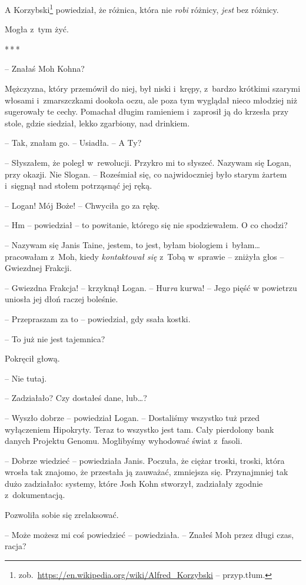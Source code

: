 \documentclass[oneside,polish,11pt,sfheadings]{mwbk}
\newcommand{\threeast}{\bigskip\par\centerline{*\,*\,*}\medskip\par}%
\begin{document}
A Korzybski\footnote{ 
zob.~\url{https://en.wikipedia.org/wiki/Alfred\_Korzybski} -- przyp.tłum.} powiedział, że różnica, która nie \emph{robi} różnicy,
\emph{jest }bez różnicy. 

Mogła z~tym żyć.
  \threeast 

-- Znałaś Moh Kohna?

Mężczyzna, który przemówił do niej, był niski i~krępy, z~bardzo krótkimi
szarymi włosami i~zmarszczkami dookoła oczu, ale poza tym wyglądał nieco
młodziej niż sugerowały te cechy. Pomachał długim ramieniem i~zaprosił
ją do krzesła przy stole, gdzie siedział, lekko zgarbiony, nad drinkiem.

-- Tak, znałam go. -- Usiadła. -- A Ty?

-- Słyszałem, że poległ w~rewolucji. Przykro mi to słyszeć. Nazywam się
Logan, przy okazji. Nie Slogan. -- Roześmiał się, co najwidoczniej było
starym żartem i~sięgnął nad stołem potrząsnąć jej ręką.

-- Logan! Mój Boże! -- Chwyciła go za rękę.

-- Hm -- powiedział -- to powitanie, którego się nie spodziewałem. O co
chodzi?

-- Nazywam się Janis Taine, jestem, to jest, byłam biologiem i~byłam\ldots
pracowałam z~Moh, kiedy \emph{kontaktował się} z~Tobą w~sprawie -- zniżyła głos -- Gwiezdnej Frakcji.

-- Gwiezdna Frakcja! -- krzyknął Logan. -- Hur\emph{ra} kurwa! -- Jego pięść
w powietrzu uniosła jej dłoń raczej boleśnie.

-- Przepraszam za to -- powiedział, gdy ssała kostki.

-- To już nie jest tajemnica?

Pokręcił głową. 

-- Nie tutaj.

-- Zadziałało? Czy dostałeś dane, lub\ldots?

-- Wyszło dobrze -- powiedział Logan. -- Dostaliśmy wszyst\-ko tuż przed
wyłączeniem Hipokryty. Teraz to wszystko jest tam. Cały pierdolony bank
danych Projektu Genomu. Moglibyśmy wyhodować świat z~fasoli.

-- Dobrze wiedzieć -- powiedziała Janis. Poczuła, że ciężar troski,
troski, która wrosła tak znajomo, że przestała ją zauważać, zmniejsza
się. Przynajmniej tak dużo zadziałało: systemy, które Josh Kohn
stworzył, zadziałały zgodnie z~dokumentacją.

Pozwoliła sobie się zrelaksować.

-- Może możesz mi coś powiedzieć -- powiedziała. -- Znałeś Moh przez długi
czas, racja?
\end{document}
